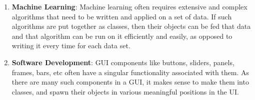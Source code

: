 \documentclass[11pt]{article}
\begin{document}
\begin{enumerate}
\begin{enumerate}
		\item \textbf{Machine Learning}: Machine learning often requires extensive and complex algorithms that need to be written and applied on a set of data. If such algorithms are put together as classes, then their objects can be fed that data and that algorithm can be run on it efficiently and easily, as opposed to writing it every time for each data set. 
		
		\item \textbf{Software Development}: GUI components like buttons, sliders, panels, frames, bars, etc often have a singular functionality associated with them. As there are many such components in a GUI, it makes sense to make them into classes, and spawn their objects in various meaningful positions in the UI. 
	\end{enumerate}
\end{enumerate}
	
\end{document}
